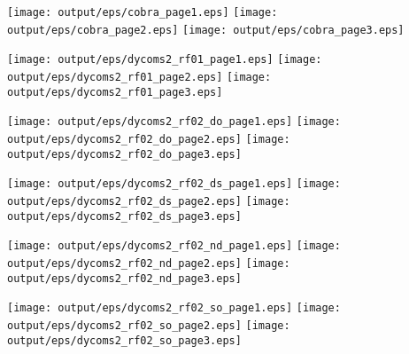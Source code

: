 \documentclass[11pt]{article}
\begin{document}
\begin{center}

\texttt{[image: output/eps/cobra\_page1.eps]}
\texttt{[image: output/eps/cobra\_page2.eps]}
\texttt{[image: output/eps/cobra\_page3.eps]}
\end{center}
\newpage

\begin{center}

\texttt{[image: output/eps/dycoms2\_rf01\_page1.eps]}
\texttt{[image: output/eps/dycoms2\_rf01\_page2.eps]}
\texttt{[image: output/eps/dycoms2\_rf01\_page3.eps]}
\end{center}
\newpage

\begin{center}

\texttt{[image: output/eps/dycoms2\_rf02\_do\_page1.eps]}
\texttt{[image: output/eps/dycoms2\_rf02\_do\_page2.eps]}
\texttt{[image: output/eps/dycoms2\_rf02\_do\_page3.eps]}
\end{center}
\newpage

\begin{center}

\texttt{[image: output/eps/dycoms2\_rf02\_ds\_page1.eps]}
\texttt{[image: output/eps/dycoms2\_rf02\_ds\_page2.eps]}
\texttt{[image: output/eps/dycoms2\_rf02\_ds\_page3.eps]}
\end{center}
\newpage

\begin{center}

\texttt{[image: output/eps/dycoms2\_rf02\_nd\_page1.eps]}
\texttt{[image: output/eps/dycoms2\_rf02\_nd\_page2.eps]}
\texttt{[image: output/eps/dycoms2\_rf02\_nd\_page3.eps]}
\end{center}
\newpage

\begin{center}

\texttt{[image: output/eps/dycoms2\_rf02\_so\_page1.eps]}
\texttt{[image: output/eps/dycoms2\_rf02\_so\_page2.eps]}
\texttt{[image: output/eps/dycoms2\_rf02\_so\_page3.eps]}
\end{center}
\newpage
\end{document}
